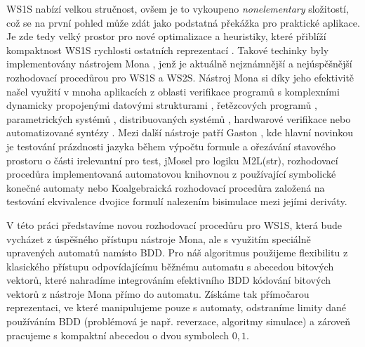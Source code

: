 WS1S nabízí velkou stručnost, ovšem je to vykoupeno \textit{nonelementary} složitostí, což se na první pohled může zdát jako podstatná překážka pro praktické aplikace. Je zde tedy velký prostor pro nové optimalizace a heuristiky, které přiblíží kompaktnost WS1S rychlosti ostatních reprezentací \cite{verifit_wsks}. Takové techinky byly implementovány nástrojem Mona \cite{mona_impl_sec}, jenž je aktuálně nejznámnější a nejúspěšnější rozhodovací procedůrou pro WS1S a WS2S. Nástroj Mona si díky jeho efektivitě našel využití v mnoha aplikacích z oblasti verifikace programů s komplexními dynamicky propojenými datovými strukturami \cite{intro_ver_app1,intro_ver_app2}, řetězcových programů \cite{intro_str_prog}, parametrických systémů \cite{intro_par_prog}, distribuovaných systémů \cite{intro_distr_sys}, hardwarové verifikace \cite{intro_hw_ver} nebo automatizované syntézy \cite{intro_aut_synt}. Mezi další nástroje patří Gaston \cite{fiedor_ws1s}, kde hlavní novinkou je testování prázdnosti jazyka během výpočtu formule a ořezávání stavového prostoru o části irelevantní pro test, jMosel \cite{intro_j_mosel} pro logiku M2L(str), rozhodovací procedůra implementovaná automatovou knihovnou z \cite{intro_symb_lib} používající symbolické konečné automaty nebo Koalgebraická rozhodovací procedůra \cite{intro_coalg} založená na testování ekvivalence dvojice formulí nalezením bisimulace mezi jejími deriváty.






V této práci představíme novou rozhodovací procedůru pro WS1S, která bude vycházet z úspěšného přístupu nástroje Mona, ale s využitím speciálně upravených automatů namísto BDD. Pro náš algoritmus použijeme flexibilitu z klasického přístupu odpovídajícímu běžnému automatu s abecedou bitových vektorů, které nahradíme integrováním efektivního BDD kódování bitových vektorů z nástroje Mona přímo do automatu. Získáme tak přímočarou reprezentaci, ve které manipulujeme pouze s automaty, odstraníme limity dané používáním BDD (problémová je např. reverzace, algoritmy simulace) a zároveň pracujeme s kompaktní abecedou o dvou symbolech $0,1$. 

